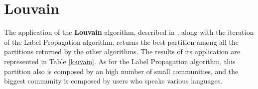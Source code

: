     \begin{table}[H]
        \centering
        \begin{subtable}{\textwidth}
        \end{subtable}
        \caption{Evaluation of the partition obtained by the application of the Label Propagaion algorithm.}
        \label{labelprop}
    \end{table}


\section{Louvain} %
\label{sec:louvain}
    The application of the \textbf{Louvain} algorithm, described in \cite{louvain}, along with the iteration
    of the Label Propagation algorithm, returns the best partition among all the partitions returned by the other
    algorithms. The results of its application are represented in Table \ref{louvain}. As for the Label Propagation
    algorithm, this partition also is composed by an high number of small communities, and the biggest community is composed by users who speaks various languages.

    \begin{table}[H]
        \centering
        \begin{subtable}{\textwidth}
        \end{subtable}
        \caption{Evaluation of the partition obtained by the application of the Louvain algorithm.}
        \label{louvain}
    \end{table}

